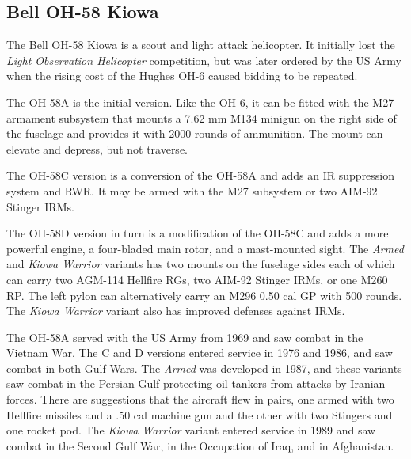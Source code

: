 
\subsection{Bell OH-58 Kiowa}

The Bell OH-58 Kiowa is a scout and light attack helicopter. It initially lost the {\itshape Light Observation Helicopter} competition, but was later ordered by the US Army when the rising cost of the Hughes OH-6 caused bidding to be repeated.

The OH-58A is the initial version. Like the OH-6, it can be fitted with the M27 armament subsystem that mounts a 7.62 mm M134 minigun on the right side of the fuselage and provides it with 2000 rounds of ammunition. The mount can elevate and depress, but not traverse.

The OH-58C version is a conversion of the OH-58A and adds an IR suppression system and RWR. It may be armed with the M27 subsystem or two AIM-92 Stinger IRMs.

The OH-58D version in turn is a modification of the OH-58C and adds a more powerful engine, a four-bladed main rotor, and a mast-mounted sight. The {\itshape Armed} and {\itshape Kiowa Warrior} variants has two mounts on the fuselage sides each of which can carry two AGM-114 Hellfire RGs, two AIM-92 Stinger IRMs, or one M260  RP. The left pylon can alternatively carry an M296 0.50 cal GP with 500 rounds. The {\itshape Kiowa Warrior} variant also has improved defenses against IRMs.

The OH-58A served with the US Army from 1969 and saw combat in the Vietnam War. The C and D versions entered service in 1976 and 1986, and saw combat in both Gulf Wars. The {\itshape Armed} was developed in 1987, and these variants saw combat in the Persian Gulf protecting oil tankers from attacks by Iranian forces. There are suggestions that the aircraft flew in pairs, one armed with two Hellfire missiles and a .50 cal machine gun and the other with two Stingers and one rocket pod. The {\itshape Kiowa Warrior} variant entered service in 1989 and saw combat in the Second Gulf War, in the Occupation of Iraq, and in Afghanistan.